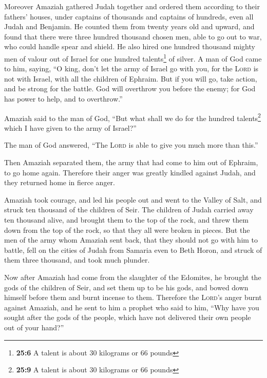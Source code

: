  Moreover Amaziah gathered Judah together and ordered them
according to their fathers' houses, under captains of thousands and
captains of hundreds, even all Judah and Benjamin. He counted them from
twenty years old and upward, and found that there were three hundred
thousand chosen men, able to go out to war, who could handle spear and
shield.  He also hired one hundred thousand mighty men of
valour out of Israel for one hundred talents\footnote{\textbf{25:6} A
  talent is about 30 kilograms or 66 pounds} of silver.  A
man of God came to him, saying, ``O king, don't let the army of Israel
go with you, for the \textsc{Lord} is not with Israel, with all the
children of Ephraim.  But if you will go, take action, and
be strong for the battle. God will overthrow you before the enemy; for
God has power to help, and to overthrow.''

 Amaziah said to the man of God, ``But what shall we do
for the hundred talents\footnote{\textbf{25:9} A talent is about 30
  kilograms or 66 pounds} which I have given to the army of Israel?''

The man of God answered, ``The \textsc{Lord} is able to give you much
more than this.''

 Then Amaziah separated them, the army that had come to
him out of Ephraim, to go home again. Therefore their anger was greatly
kindled against Judah, and they returned home in fierce anger.

 Amaziah took courage, and led his people out and went to
the Valley of Salt, and struck ten thousand of the children of Seir.
 The children of Judah carried away ten thousand alive,
and brought them to the top of the rock, and threw them down from the
top of the rock, so that they all were broken in pieces. 
But the men of the army whom Amaziah sent back, that they should not go
with him to battle, fell on the cities of Judah from Samaria even to
Beth Horon, and struck of them three thousand, and took much plunder.

 Now after Amaziah had come from the slaughter of the
Edomites, he brought the gods of the children of Seir, and set them up
to be his gods, and bowed down himself before them and burnt incense to
them.  Therefore the \textsc{Lord}'s anger burnt against
Amaziah, and he sent to him a prophet who said to him, ``Why have you
sought after the gods of the people, which have not delivered their own
people out of your hand?''

